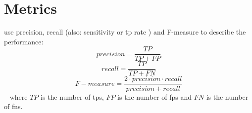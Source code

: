 \section{Metrics}
\label{sec:metrics}

\citet{chen_web_2008} use precision, recall (also: sensitivity or \acl{tp} rate \citep{palivela_optimization_2021}) 
and F-measure to describe the performance:
$$precision = \frac{TP}{TP + FP}$$
$$recall = \frac{TP}{TP + FN}$$
$$F-measure = \frac{2 \cdot precision \cdot recall}{precision + recall}$$~\citep{chen_web_2008,abbasi_writeprints_2008}
where $TP$ is the number of \aclp{tp}, $FP$ is the number of \aclp{fp} 
and $FN$ is the number of \aclp{fn}.